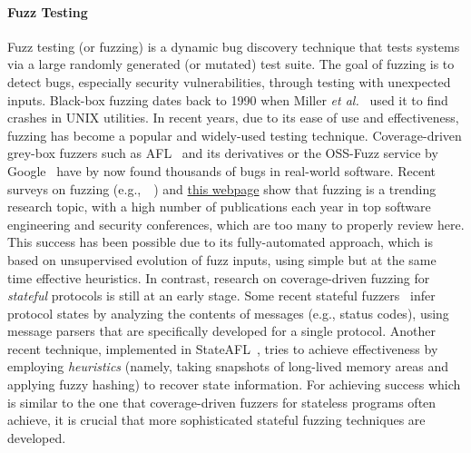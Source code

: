 \documentclass[11pt]{article}
\newcommand{\mycomment}[1]{}
\newcommand{\FIX}[1]{\textcolor{red}{\textbf{#1}}}
\newcommand{\UNREVISED}[1]{\textcolor{DarkGrey}{#1}}
\newcommand{\system}[1]{\mbox{\textsf{#1}}}
\newcommand{\myparagraph}{}
\let\myparagraph=\paragraph
\renewcommand{\paragraph}{\vspace{-3mm}\myparagraph}
\newcommand{\eg}{e.\/g.,\ }
\newcommand{\etal}{\textit{et al.}}
\begin{document}
\paragraph{Fuzz Testing}
Fuzz testing (or fuzzing) is a dynamic bug discovery technique that tests
systems via a large randomly generated (or mutated) test suite. The goal of
fuzzing is to detect bugs, especially security vulnerabilities, through
testing with unexpected inputs. Black-box fuzzing dates back to 1990 when
Miller \etal~\cite{Fuzz@CACM-90} used it to find crashes in UNIX utilities. In
recent years, due to its ease of use and effectiveness, fuzzing has become a
popular and widely-used testing technique. Coverage-driven grey-box fuzzers
such as \system{AFL}~\cite{AFL} and its derivatives or the OSS-Fuzz service by
Google~\cite{OSS-Fuzz@USENIX-17} have by now found thousands of bugs in
real-world software. Recent surveys on fuzzing
(\eg~\cite{FuzzingSurvey@TSE-21,FuzzingRoadmap@CompSurveys-22}) and
\href{https://wcventure.github.io/FuzzingPaper/}{this webpage} show that
fuzzing is a trending research topic, with a high number of publications each
year in top software engineering and security conferences, which are too many
to properly review here.
%
This success has been possible due to its fully-automated approach, which is
based on unsupervised evolution of fuzz inputs, using simple but at the same
time effective heuristics. In contrast, research on coverage-driven fuzzing
for \emph{stateful} protocols is still at an early stage.
%
Some recent stateful fuzzers~\cite{AFLNET@ICST-20,Snipuzz@CCS-21} infer
protocol states by analyzing the contents of messages (e.g., status codes),
using message parsers that are specifically developed for a single protocol.
Another recent technique, implemented in
\system{StateAFL}~\cite{StateAFL@ESE-22}, tries to achieve effectiveness by
employing \emph{heuristics} (namely, taking snapshots of long-lived memory
areas and applying fuzzy hashing) to recover state information.
%
For achieving success which is similar to the one that coverage-driven fuzzers
for stateless programs often achieve, it is crucial that more sophisticated
stateful fuzzing techniques are developed.


\mycomment{
\section{Significance and Scientific Novelty} \label{sec:significance}
\FIX{No text here yet :-(}

\UNREVISED{However, it may be possible to skip this section if we manage to have short ``Significance'' paragraphs for each of the six tasks in the next section.}
}
\end{document}
